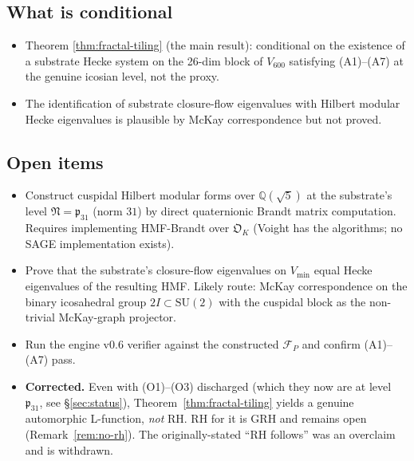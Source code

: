 \documentclass[11pt,a4paper]{article}
\theoremstyle{definition}
\newcommand{\Q}{\mathbb{Q}}
\newcommand{\Vmin}{V_{\min}}
\begin{document}
\subsection{What is conditional}
\begin{itemize}
\item Theorem \ref{thm:fractal-tiling} (the main result): conditional on the
      existence of a substrate Hecke system on the 26-dim block of $V_{600}$
      satisfying (A1)--(A7) at the genuine icosian level, not the proxy.
\item The identification of substrate closure-flow eigenvalues with Hilbert
      modular Hecke eigenvalues is plausible by McKay correspondence but not
      proved.
\end{itemize}

\subsection{Open items}
\begin{itemize}
\item[(O1)] Construct cuspidal Hilbert modular forms over $\Q(\sqrt{5})$ at
            the substrate's level $\mathfrak{N}=\mathfrak{p}_{31}$ (norm $31$) by direct
            quaternionic Brandt matrix computation. Requires implementing
            HMF-Brandt over $\mathfrak{O}_K$ (Voight \cite{Voight} has the
            algorithms; no SAGE implementation exists).
\item[(O2)] Prove that the substrate's closure-flow eigenvalues on $\Vmin$
            equal Hecke eigenvalues of the resulting HMF. Likely route: McKay
            correspondence on the binary icosahedral group $2I\subset
            \mathrm{SU}(2)$ with the cuspidal block as the non-trivial
            McKay-graph projector.
\item[(O3)] Run the engine v0.6 verifier against the constructed
            $\mathcal{F}_P$ and confirm (A1)--(A7) pass.
\item[(O4)] \textbf{Corrected.} Even with (O1)--(O3) discharged (which they now
            are at level $\mathfrak{p}_{31}$, see \S\ref{sec:status}),
            Theorem~\ref{thm:fractal-tiling} yields a genuine automorphic
            L-function, \emph{not} RH. RH for it is GRH and remains open
            (Remark~\ref{rem:no-rh}). The originally-stated ``RH follows'' was
            an overclaim and is withdrawn.
\end{itemize}
\end{document}
